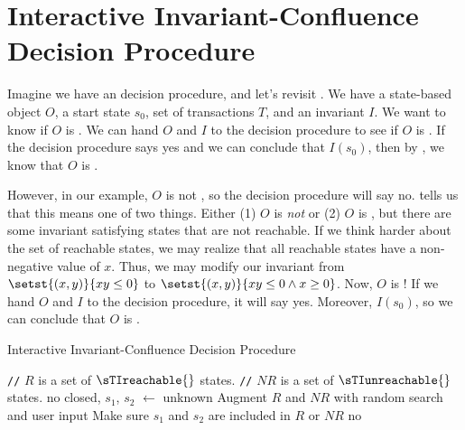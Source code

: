 \section{Interactive Invariant-Confluence Decision Procedure}
Imagine we have an \Iclosed{} decision procedure, and let's revisit
. We have a state-based object $O$, a start
state $s_0$, set of transactions $T$, and an invariant $I$. We want to know if
$O$ is \sTIconfluent{}. We can hand $O$ and $I$ to the \Iclosed{} decision
procedure to see if $O$ is \Iclosed{}. If the decision procedure says yes and
we can conclude that $I(s_0)$, then by , we know
that $O$ is \sTIconfluent{}.

However, in our example, $O$ is not \Iclosed{}, so the decision procedure will
say no.  tells us that this means one of two
things. Either (1) $O$ is \emph{not} \sTIconfluent{} or (2) $O$ is
\sTIconfluent{}, but there are some invariant satisfying states that are not
reachable. If we think harder about the set of reachable states, we may realize
that all reachable states have a non-negative value of $x$. Thus, we may modify
our invariant from $\setst{(x, y)}{xy \leq 0}$ to $\setst{(x, y)}{xy \leq 0
\land x \geq 0}$. Now, $O$ is \Iclosed{}! If we hand $O$ and $I$ to the
decision procedure, it will say yes. Moreover, $I(s_0)$, so we can conclude
that $O$ is \sTIconfluent{}.

\newcommand{\comment}[1]{\State \textcolor{flatdenim}{\texttt{//} #1}}
\begin{algorithm}
  \caption{Interactive Invariant-Confluence Decision Procedure}%
  \begin{algorithmic}
      \State
        \Return {}
    \EndFunction

    \State

    \comment{$R$ is a set of $\sTIreachable{}$ states.}
    \comment{$NR$ is a set of $\sTIunreachable{}$ states.}
        \State \Return no
      \EndIf
      \State closed, $s_1$, $s_2$ $\gets$ 
        \State \Return unknown
        \State {}
      \Else
        \State Augment $R$ and $NR$ with random search and user input
        \State Make sure $s_1$ and $s_2$ are included in $R$ or $NR$
          \State \Return no
        \Else
          \State \Return {}
        \EndIf
      \EndIf
    \EndFunction
  \end{algorithmic}
\end{algorithm}

